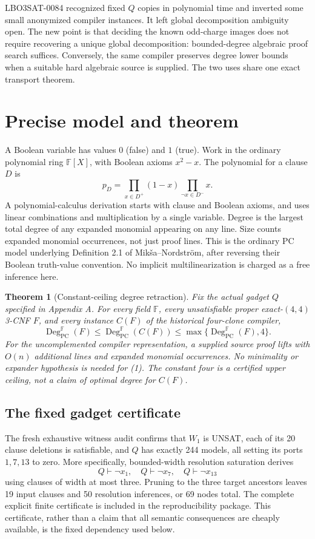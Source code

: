 \documentclass[11pt]{article}
\newtheorem{theorem}{Theorem}
\newcommand{\PC}{\operatorname{PC}}
\newcommand{\F}{\mathbb F}
\newcommand{\degpc}{\operatorname{Deg}_{\PC}}
\begin{document}
LBO3SAT-0084 recognized fixed $Q$ copies in polynomial time and inverted some small anonymized compiler instances. It left global decomposition ambiguity open. The new point is that deciding the known odd-charge images does not require recovering a unique global decomposition: bounded-degree algebraic proof search suffices. Conversely, the same compiler preserves degree lower bounds when a suitable hard algebraic source is supplied. The two uses share one exact transport theorem.

\section{Precise model and theorem}
A Boolean variable has values $0$ (false) and $1$ (true). Work in the ordinary polynomial ring $\F[X]$, with Boolean axioms $x^2-x$. The polynomial for a clause $D$ is
\[
 p_D=\prod_{x\in D^+}(1-x)\prod_{\neg x\in D^-}x.
\]
A polynomial-calculus derivation starts with clause and Boolean axioms, and uses linear combinations and multiplication by a single variable. Degree is the largest total degree of any expanded monomial appearing on any line. Size counts expanded monomial occurrences, not just proof lines. This is the ordinary PC model underlying Definition 2.1 of Mik\v{s}a--Nordstr\"om, after reversing their Boolean truth-value convention. No implicit multilinearization is charged as a free inference here.

\begin{theorem}[Constant-ceiling degree retraction]\label{thm:retraction}
Fix the actual gadget $Q$ specified in Appendix A. For every field $\F$, every unsatisfiable proper exact-$(4,4)$ 3-CNF $F$, and every instance $C(F)$ of the historical four-clone compiler,
\[
\degpc^{\F}(F)\le\degpc^{\F}(C(F))
\le\max\{\degpc^{\F}(F),4\}.
\tag{1}
\]
For the uncomplemented compiler representation, a supplied source proof lifts with $O(n)$ additional lines and expanded monomial occurrences. No minimality or expander hypothesis is needed for (1). The constant four is a certified upper ceiling, not a claim of optimal degree for $C(F)$.
\end{theorem}

\subsection{The fixed gadget certificate}
The fresh exhaustive witness audit confirms that $W_1$ is UNSAT, each of its 20 clause deletions is satisfiable, and $Q$ has exactly 244 models, all setting its ports $1,7,13$ to zero. More specifically, bounded-width resolution saturation derives
\[
 Q\vdash\neg x_1,\quad Q\vdash\neg x_7,\quad Q\vdash\neg x_{13}
\]
using clauses of width at most three. Pruning to the three target ancestors leaves 19 input clauses and 50 resolution inferences, or 69 nodes total. The complete explicit finite certificate is included in the reproducibility package. This certificate, rather than a claim that all semantic consequences are cheaply available, is the fixed dependency used below.
\end{document}
